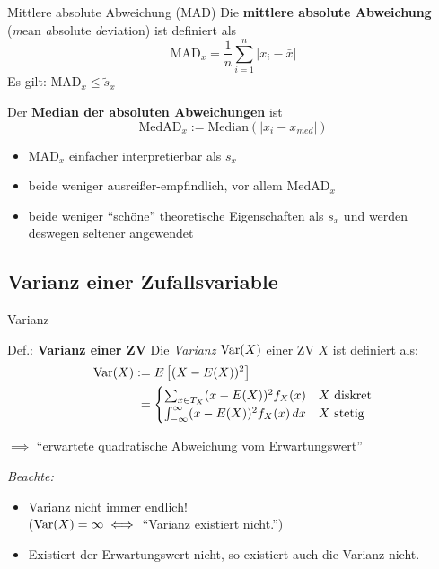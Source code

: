 \documentclass[
  10pt,
  ignorenonframetext,
]{beamer}
\providecommand{\tightlist}{%
  \setlength{\itemsep}{0pt}\setlength{\parskip}{0pt}}
\begin{document}
\begin{frame}{Mittlere absolute Abweichung (MAD)}
\protect\hypertarget{mittlere-absolute-abweichung-mad}{}
Die \textbf{mittlere absolute Abweichung} (\emph{m}ean \emph{a}bsolute
\emph{d}eviation) ist definiert als \begin{equation*}
    \text{MAD}_x= \frac{1}{n} \sum_{i=1}^n|x_i - \bar x|
\end{equation*} Es gilt: MAD\(_x \leq \widetilde s_x\)

Der \textbf{Median der absoluten Abweichungen} ist \begin{equation*}
    \text{MedAD}_x := \text{Median}(|x_i - x_{med}|)
\end{equation*}

\begin{itemize}
\tightlist
\item
  \(\text{MAD}_x\) einfacher interpretierbar als \(s_x\)
\item
  beide weniger ausreißer-empfindlich, vor allem \(\text{MedAD}_x\)
\item
  beide weniger ``schöne'' theoretische Eigenschaften als \(s_x\) und
  werden deswegen seltener angewendet
\end{itemize}
\end{frame}

\hypertarget{varianz-einer-zufallsvariable}{%
\subsection{Varianz einer
Zufallsvariable}\label{varianz-einer-zufallsvariable}}

\begin{frame}{Varianz}
\protect\hypertarget{varianz}{}
\begin{block}{Def.: \textbf{Varianz einer ZV}}
\protect\hypertarget{def.-varianz-einer-zv}{}
Die \emph{Varianz} \(\operatorname{Var}(X)\) einer ZV \(X\) ist definiert als:
\begin{align*}
\operatorname{Var}(X) &:= E\left[(X -E(X))^2\right] \\
        &\phantom{:}= \begin{cases} 
             \sum_{x \in T_X} (x - E(X))^2 f_X(x) & X \text{ diskret} \\
              \int_{-\infty}^\infty (x - E(X))^2 f_X(x) \,dx & X \text{ stetig}
            \end{cases}
\end{align*}
\end{block}

\(\implies\) ``erwartete quadratische Abweichung vom Erwartungswert''

\emph{Beachte:}

\begin{itemize}
\tightlist
\item
  Varianz nicht immer endlich!\\
  (\(\operatorname{Var}(X) = \infty \iff\) ``Varianz existiert nicht.'')
\item
  Existiert der Erwartungswert nicht, so existiert auch die Varianz
  nicht.
\end{itemize}
\end{frame}
\end{document}

